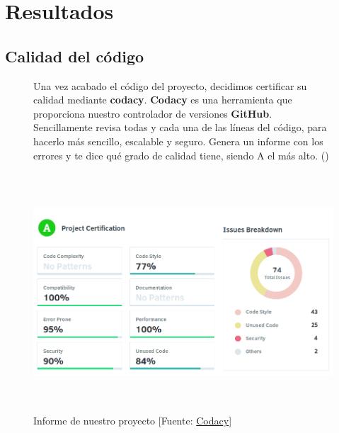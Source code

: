 \cleardoublepage

\chapter{Resultados}
\label{makereference6}


\section{Calidad del código}
\label{makereference6.3}

\begin{figure}[htb]
	Una vez acabado el código del proyecto, decidimos certificar su calidad mediante \textbf{codacy}.
	\textbf{Codacy} es una herramienta que proporciona nuestro controlador de versiones \textbf{GitHub}. Sencillamente revisa todas y cada una de las líneas del código, para hacerlo más sencillo, escalable y seguro. Genera un informe con los errores y te dice qué grado de calidad tiene, siendo A el más alto. (\cite{ARP:Codacy:2017})
	
	\begin{center}
		\includegraphics[height=3.5in]{figures/codacy.png}
		\caption{Informe de nuestro proyecto [Fuente: \href{https://www.codacy.com}{Codacy}]}
	\end{center}
	
	\label{codacy}
\end{figure}